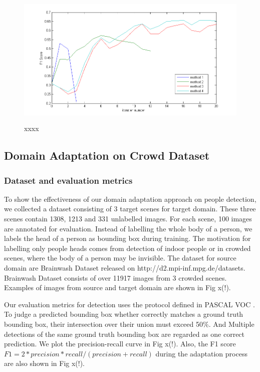 \documentclass[runningheads]{llncs}
\begin{document}
\begin{figure}
\centering
\includegraphics[height=6.5cm]{images/f1score.png}
\caption{xxxx}
\label{fig:precisionrecallcurve}
\end{figure}

\subsection{Domain Adaptation on Crowd Dataset}

\subsubsection{Dataset and evaluation metrics}
To show the effectiveness of our domain adaptation approach on people detection, we collected a dataset consisting of 3 target scenes for target domain. These three scenes contain 1308, 1213 and 331 unlabelled images. For each scene, 100 images are annotated for evaluation. Instead of labelling the whole body of a person, we labels the head of a person as bounding box during training. The motivation for labelling only people heads comes from detection of indoor people or in crowded scenes, where the body of a person may be invisible. The dataset for source domain are Brainwash Dataset released on http://d2.mpi-inf.mpg.de/datasets. Brainwash Dataset consists of over 11917 images from 3 crowded scenes. Examples of images from source and target domain are shown in Fig x(!).

Our evaluation metrics for detection uses the protocol defined in PASCAL VOC \cite{everingham2015pascal}. To judge a predicted bounding box whether correctly matches a ground truth bounding box, their intersection over their union must exceed 50\%. And Multiple detections of the same ground truth bounding box are regarded as one correct prediction. We plot the precision-recall curve in Fig x(!). Also, the F1 score $F1 = 2*precision*recall/(precision+recall)$ during the adaptation process are also shown in Fig x(!).
\end{document}
